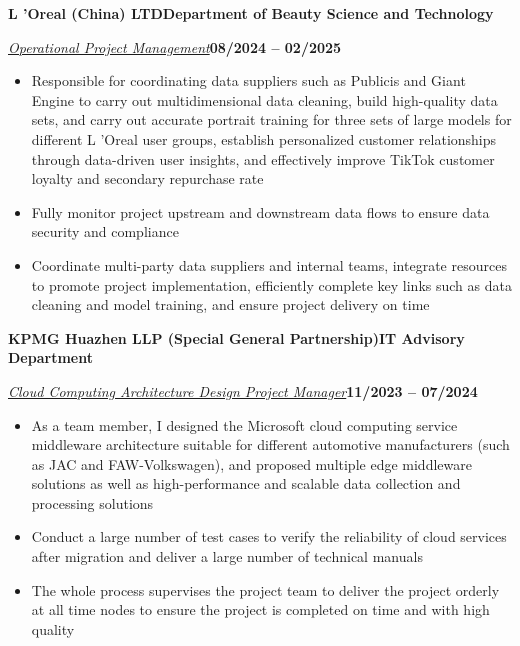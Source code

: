\documentclass[10pt,a4paper]{article}
\newcommand{\entrycompany}[2]{%
  \par\vspace{0.80bp}\noindent\textbf{#1}\hfill\textbf{#2}\par\vspace{0.50bp}%
}
\let\jobcompany\entrycompany
\newcommand{\metaline}[2]{%
  \par\noindent\uline{\textit{#1}}\hfill\textbf{#2}\par\vspace{0.50bp}%
}
\let\roleline\metaline
\newenvironment{cvitems}{%
  \begin{itemize}[leftmargin=14.20bp,labelwidth=4.20bp,labelsep=10.00bp,align=left,
    topsep=0bp,itemsep=0bp,parsep=0bp,partopsep=0bp,label={\textbullet}]
}{\end{itemize}}
\begin{document}
\jobcompany{L 'Oreal (China) LTD}{Department of Beauty Science and Technology}
\roleline{Operational Project Management}{08/2024 -- 02/2025}
\begin{cvitems}
\item Responsible for coordinating data suppliers such as Publicis and Giant Engine to carry out multidimensional data cleaning, build high-quality data sets, and carry out accurate portrait training for three sets of large models for different L 'Oreal user groups, establish personalized customer relationships through data-driven user insights, and effectively improve TikTok customer loyalty and secondary repurchase rate
\item Fully monitor project upstream and downstream data flows to ensure data security and compliance
\item Coordinate multi-party data suppliers and internal teams, integrate resources to promote project implementation, efficiently complete key links such as data cleaning and model training, and ensure project delivery on time
\end{cvitems}

\jobcompany{KPMG Huazhen LLP (Special General Partnership)}{IT Advisory Department}
\roleline{Cloud Computing Architecture Design Project Manager}{11/2023 -- 07/2024}
\begin{cvitems}
\item As a team member, I designed the Microsoft cloud computing service middleware architecture suitable for different automotive manufacturers (such as JAC and FAW-Volkswagen), and proposed multiple edge middleware solutions as well as high-performance and scalable data collection and processing solutions
\item Conduct a large number of test cases to verify the reliability of cloud services after migration and deliver a large number of technical manuals
\item The whole process supervises the project team to deliver the project orderly at all time nodes to ensure the project is completed on time and with high quality
\end{cvitems}
\end{document}
